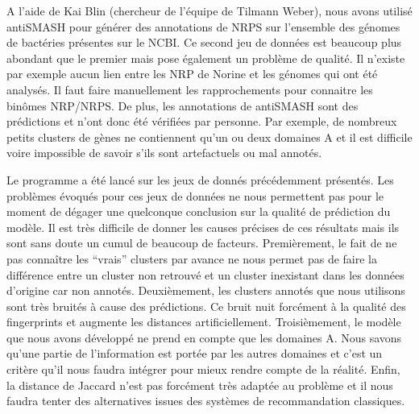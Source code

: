 
A l'aide de Kai Blin (chercheur de l'équipe de Tilmann Weber), nous avons utilisé antiSMASH pour générer des annotations de NRPS sur l'ensemble des génomes de bactéries présentes sur le NCBI.
Ce second jeu de données est beaucoup plus abondant que le premier mais pose également un problème de qualité.
Il n'existe par exemple aucun lien entre les NRP de Norine et les génomes qui ont été analysés.
Il faut faire manuellement les rapprochements pour connaitre les binômes NRP/NRPS.
De plus, les annotations de antiSMASH sont des prédictions et n'ont donc été vérifiées par personne.
Par exemple, de nombreux petits clusters de gènes ne contiennent qu'un ou deux domaines A et il est difficile voire impossible de savoir s'ils sont artefactuels ou mal annotés.

Le programme a été lancé sur les jeux de donnés précédemment présentés.
Les problèmes évoqués pour ces jeux de données ne nous permettent pas pour le moment de dégager une quelconque conclusion sur la qualité de prédiction du modèle.
Il est très difficile de donner les causes précises de ces résultats mais ils sont sans doute un cumul de beaucoup de facteurs.
Premièrement, le fait de ne pas connaître les ``vrais'' clusters par avance ne nous permet pas de faire la différence entre un cluster non retrouvé et un cluster inexistant dans les données d'origine car non annotés.
Deuxièmement, les clusters annotés que nous utilisons sont très bruités à cause des prédictions.
Ce bruit nuit forcément à la qualité des fingerprints et augmente les distances artificiellement.
Troisièmement, le modèle que nous avons développé ne prend en compte que les domaines A.
Nous savons qu'une partie de l'information est portée par les autres domaines et c'est un critère qu'il nous faudra intégrer pour mieux rendre compte de la réalité.
Enfin, la distance de Jaccard n'est pas forcément très adaptée au problème et il nous faudra tenter des alternatives issues des systèmes de recommandation classiques.


